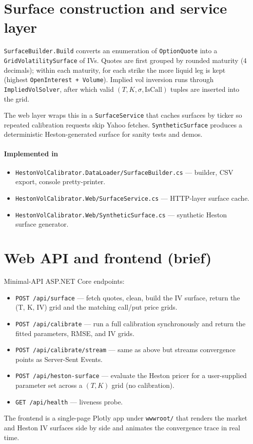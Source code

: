 \documentclass[11pt,a4paper]{article}
\begin{document}
\section{Surface construction and service layer}
\texttt{SurfaceBuilder.Build} converts an enumeration of \texttt{OptionQuote}
into a \texttt{GridVolatilitySurface} of IVs. Quotes are first grouped by
rounded maturity (4 decimals); within each maturity, for each strike the more
liquid leg is kept (highest \texttt{OpenInterest + Volume}). Implied vol
inversion runs through \texttt{ImpliedVolSolver}, after which valid
$(T, K, \sigma, \text{IsCall})$ tuples are inserted into the grid.

The web layer wraps this in a \texttt{SurfaceService} that caches surfaces by
ticker so repeated calibration requests skip Yahoo fetches.
\texttt{SyntheticSurface} produces a deterministic Heston-generated surface for
sanity tests and demos.

\paragraph*{Implemented in}
\begin{itemize}
\item \texttt{HestonVolCalibrator.DataLoader/SurfaceBuilder.cs} --- builder, CSV export, console pretty-printer.
\item \texttt{HestonVolCalibrator.Web/SurfaceService.cs} --- HTTP-layer surface cache.
\item \texttt{HestonVolCalibrator.Web/SyntheticSurface.cs} --- synthetic Heston surface generator.
\end{itemize}

\section{Web API and frontend (brief)}
Minimal-API ASP.NET Core endpoints:
\begin{itemize}
\item \texttt{POST /api/surface} --- fetch quotes, clean, build the IV surface, return the (T, K, IV) grid and the matching call/put price grids.
\item \texttt{POST /api/calibrate} --- run a full calibration synchronously and return the fitted parameters, RMSE, and IV grids.
\item \texttt{POST /api/calibrate/stream} --- same as above but streams convergence points as Server-Sent Events.
\item \texttt{POST /api/heston-surface} --- evaluate the Heston pricer for a user-supplied parameter set across a $(T, K)$ grid (no calibration).
\item \texttt{GET /api/health} --- liveness probe.
\end{itemize}
The frontend is a single-page Plotly app under \texttt{wwwroot/} that renders the
market and Heston IV surfaces side by side and animates the convergence trace
in real time.
\end{document}
